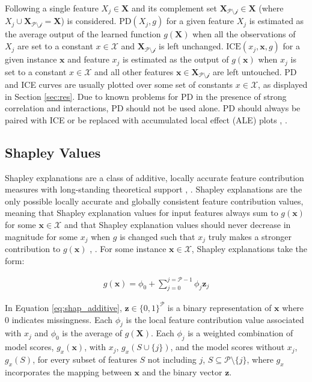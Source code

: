 \documentclass[information,article,submit,moreauthors,pdftex]{definitions/mdpi}
\begin{document}
Following \citet{esl} a single feature $X_j \in \mathbf{X}$ and its complement set $\mathbf{X}_{\mathcal{P\setminus{j}}} \in \mathbf{X}$ (where $X_j \cup \mathbf{X}_{\mathcal{P\setminus{j}}} = \mathbf{X}$) is considered. $\text{PD}(X_j, g)$ for a given feature $X_j$ is estimated as the average output of the learned function $g(\mathbf{X})$ when all the observations of $X_j$ are set to a constant $x \in \mathcal{X}$ and $\mathbf{X}_{\mathcal{P\setminus{j}}}$ is left unchanged. $\text{ICE}(x_j, \mathbf{x}, g)$ for a given instance $\mathbf{x}$ and feature $x_j$ is estimated as the output of $g(\mathbf{x})$ when $x_j$ is set to a constant $x \in \mathcal{X}$ and all other features $\mathbf{x} \in \mathbf{X}_{\mathcal{P\setminus{j}}}$ are left untouched. PD and ICE curves are usually plotted over some set of constants $x \in \mathcal{X}$, as displayed in Section \ref{sec:res}. Due to known problems for PD in the presence of strong correlation and interactions, PD should not be used alone. PD should always be paired with ICE or be replaced with accumulated local effect (ALE) plots \cite{ice_plots}, \cite{ale_plot}.

\subsection{Shapley Values}\label{ssec:shap}

Shapley explanations are a class of additive, locally accurate feature contribution measures with long-standing theoretical support \cite{shapley}, \cite{shapley1988shapley}. Shapley explanations are the only possible locally accurate and globally consistent feature contribution values, meaning that Shapley explanation values for input features always sum to $g(\mathbf{x})$ for some $\mathbf{x} \in \mathcal{X}$ and that Shapley explanation values should never decrease in magnitude for some $x_j$ when $g$ is changed such that $x_j$ truly makes a stronger contribution to $g(\mathbf{x})$ \cite{shapley}, \cite{tree_shap}. For some instance $\mathbf{x} \in \mathcal{X}$, Shapley explanations take the form: 

\begin{equation}
\label{eq:shap_additive}
\begin{aligned}
g(\mathbf{x}) = \phi_0 + \sum_{j=0}^{j=\mathcal{P} - 1} \phi_j \mathbf{z}_j
\end{aligned}
\end{equation}

\noindent In Equation \ref{eq:shap_additive}, $\mathbf{z} \in \{0,1\}^\mathcal{P}$ is a binary representation of $\mathbf{x}$ where 0 indicates missingness. Each $\phi_j$ is the local feature contribution value associated with $x_j$ and $\phi_0$ is the average of $g(\mathbf{X})$. Each $\phi_j$ is a weighted combination of model scores, $g_x(\mathbf{x})$, with $x_j$, $g_x(S \cup \{j\})$, and the model scores without $x_j$, $g_x(S)$, for every subset of features $S$ not including $j$, $S \subseteq \mathcal{P} \setminus \{j\}$, where $g_x$ incorporates the mapping between $\mathbf{x}$ and the binary vector $\mathbf{z}$. 
\end{document}
